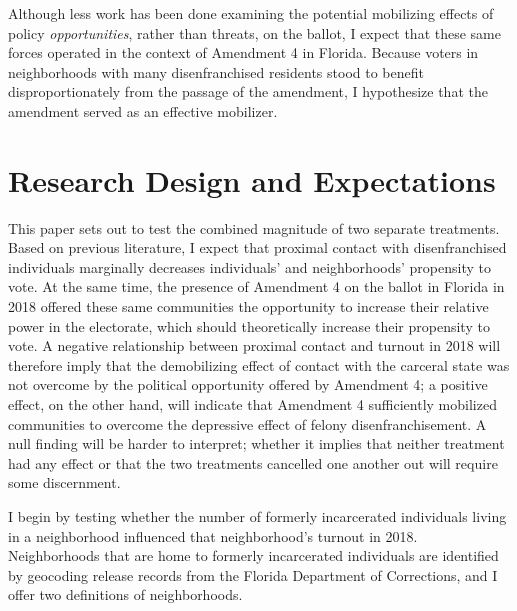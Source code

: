 \documentclass[
  12pt,
]{article}
\begin{document}
Although less work has been done examining the potential mobilizing effects of policy \emph{opportunities}, rather than threats, on the ballot, I expect that these same forces operated in the context of Amendment 4 in Florida. Because voters in neighborhoods with many disenfranchised residents stood to benefit disproportionately from the passage of the amendment, I hypothesize that the amendment served as an effective mobilizer.

\hypertarget{research-design-and-expectations}{%
\section*{Research Design and Expectations}\label{research-design-and-expectations}}

This paper sets out to test the combined magnitude of two separate treatments. Based on previous literature, I expect that proximal contact with disenfranchised individuals marginally decreases individuals' and neighborhoods' propensity to vote. At the same time, the presence of Amendment 4 on the ballot in Florida in 2018 offered these same communities the opportunity to increase their relative power in the electorate, which should theoretically increase their propensity to vote. A negative relationship between proximal contact and turnout in 2018 will therefore imply that the demobilizing effect of contact with the carceral state was not overcome by the political opportunity offered by Amendment 4; a positive effect, on the other hand, will indicate that Amendment 4 sufficiently mobilized communities to overcome the depressive effect of felony disenfranchisement. A null finding will be harder to interpret; whether it implies that neither treatment had any effect or that the two treatments cancelled one another out will require some discernment.

I begin by testing whether the number of formerly incarcerated individuals living in a neighborhood influenced that neighborhood's turnout in 2018. Neighborhoods that are home to formerly incarcerated individuals are identified by geocoding release records from the Florida Department of Corrections, and I offer two definitions of neighborhoods.
\end{document}
